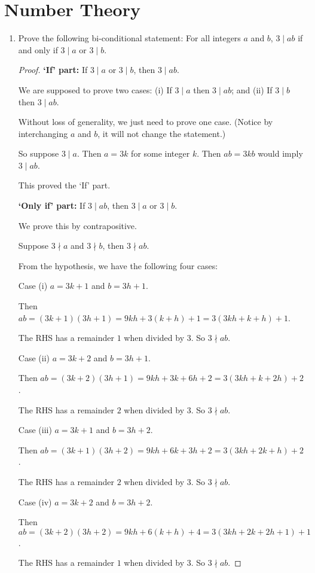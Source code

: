 \documentclass[12pt,a4 paper]{article}
\begin{document}
\section{Number Theory}
\begin{enumerate}
\item Prove the following bi-conditional statement: For all integers $a$ and $b$, $3\mid ab$ if and only if $3\mid a$ or $3\mid b$.

\begin{proof}
\textbf{`If' part:} If $3\mid a$ or $3\mid b$, then $3\mid ab$.

We are supposed to prove two cases: (i) If $3\mid a$ then $3\mid ab$; and (ii) If $3\mid b$ then $3\mid ab$.

Without loss of generality, we just need to prove one case. (Notice by interchanging $a$ and $b$, it will not change the statement.)

So suppose $3\mid a$. Then $a=3k$ for some integer $k$. Then $ab=3kb$ would imply $3\mid ab$.

This proved the `If' part.

\textbf{`Only if' part:} If $3\mid ab$, then $3\mid a$ or $3\mid b$.

We prove this by contrapositive.

Suppose $3\nmid a$ and $3\nmid b$, then $3\nmid ab$.

From the hypothesis, we have the following four cases:

Case (i) $a=3k+1$ and $b=3h+1$.

Then $ab=(3k+1)(3h+1)=9kh+3(k+h)+1=3(3kh+k+h)+1$.

The RHS has a remainder $1$ when divided by $3$. So $3\nmid ab$.

Case (ii) $a=3k+2$ and $b=3h+1$.

Then $ab=(3k+2)(3h+1)=9kh+3k+6h+2=3(3kh+k+2h)+2$.

The RHS has a remainder $2$ when divided by $3$. So $3\nmid ab$.

Case (iii) $a=3k+1$ and $b=3h+2$.

Then $ab=(3k+1)(3h+2)=9kh+6k+3h+2=3(3kh+2k+h)+2$.

The RHS has a remainder $2$ when divided by $3$. So $3\nmid ab$.

Case (iv) $a=3k+2$ and $b=3h+2$.

Then $ab=(3k+2)(3h+2)=9kh+6(k+h)+4=3(3kh+2k+2h+1)+1$.

The RHS has a remainder $1$ when divided by $3$. So $3\nmid ab$.


\end{proof}
\end{enumerate}
\end{document}
